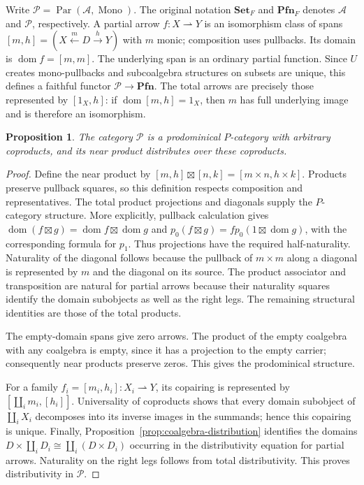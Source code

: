 \documentclass[11pt]{article}
\newtheorem{proposition}[theorem]{Proposition}
\newcommand{\dom}{\operatorname{dom}}\newcommand{\ran}{\operatorname{ran}}
\begin{document}
Write $\mathcal P=\operatorname{Par}(\mathcal A,\operatorname{Mono})$. The original notation $\mathbf{Set}_F$ and $\mathbf{Pfn}_F$ denotes $\mathcal A$ and $\mathcal P$, respectively. A partial arrow $f:X\rightharpoonup Y$ is an isomorphism class of spans
$[m,h]=(X\xleftarrow{m}D\xrightarrow{h}Y)$ with $m$ monic; composition uses pullbacks. Its domain is $\dom f=[m,m]$. The underlying span is an ordinary partial function. Since $U$ creates mono-pullbacks and subcoalgebra structures on subsets are unique, this defines a faithful functor $\mathcal P\to\mathbf{Pfn}$. The total arrows are precisely those represented by $[1_X,h]$: if $\dom[m,h]=1_X$, then $m$ has full underlying image and is therefore an isomorphism.

\begin{proposition}\label{prop:coalgebra-partial-structure}
The category $\mathcal P$ is a prodominical $P$-category with arbitrary coproducts, and its near product distributes over these coproducts.
\end{proposition}
\begin{proof}
Define the near product by
$[m,h]\boxtimes[n,k]=[m\times n,h\times k]$.
Products preserve pullback squares, so this definition respects composition and representatives. The total product projections and diagonals supply the $P$-category structure. More explicitly, pullback calculation gives
$\dom(f\boxtimes g)=\dom f\boxtimes\dom g$ and
$p_0(f\boxtimes g)=fp_0(1\boxtimes\dom g)$, with the corresponding formula for $p_1$. Thus projections have the required half-naturality. Naturality of the diagonal follows because the pullback of $m\times m$ along a diagonal is represented by $m$ and the diagonal on its source. The product associator and transposition are natural for partial arrows because their naturality squares identify the domain subobjects as well as the right legs. The remaining structural identities are those of the total products.

The empty-domain spans give zero arrows. The product of the empty coalgebra with any coalgebra is empty, since it has a projection to the empty carrier; consequently near products preserve zeros. This gives the prodominical structure.

For a family $f_i=[m_i,h_i]:X_i\rightharpoonup Y$, its copairing is represented by
$[\coprod_i m_i,[h_i]]$.
Universality of coproducts shows that every domain subobject of $\coprod_iX_i$ decomposes into its inverse images in the summands; hence this copairing is unique. Finally, Proposition~\ref{prop:coalgebra-distribution} identifies the domains
$D\times\coprod_iD_i\cong\coprod_i(D\times D_i)$ occurring in the distributivity equation for partial arrows. Naturality on the right legs follows from total distributivity. This proves distributivity in $\mathcal P$.
\end{proof}
\end{document}
